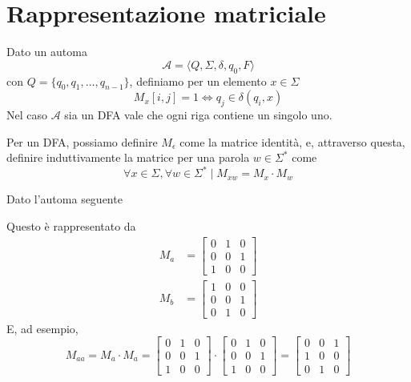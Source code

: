 \documentclass[12pt]{article}
\begin{document}
\section{Rappresentazione matriciale}
Dato un automa
$$ \mathcal{A} = \langle Q, \Sigma, \delta, q_0, F \rangle $$
con $Q = \{q_0, q_1, \dots, q_{n - 1} \}$, definiamo per un elemento $x \in \Sigma$
$$ M_x[i, j] = 1 \Leftrightarrow q_j \in \delta(q_i, x) $$
Nel caso $\mathcal{A}$ sia un DFA vale che ogni riga contiene un singolo uno.

Per un DFA, possiamo definire $ M_\epsilon$ come la matrice identità, e, attraverso questa, definire induttivamente la matrice per una parola $w \in \Sigma^*$ come
$$ \forall x \in \Sigma, \forall w \in \Sigma^* \mid M_{xw} = M_x \cdot M_w $$

\begin{tcolorbox}
	Dato l'automa seguente
	\begin{center}
	\end{center}
	Questo è rappresentato da
	\begin{align*}
		M_a &= \begin{bmatrix} 0 & 1 & 0 \\ 0 & 0 & 1 \\ 1 & 0 & 0 \end{bmatrix} \\
		M_b &= \begin{bmatrix} 1 & 0 & 0 \\ 0 & 0 & 1 \\ 0 & 1 & 0 \end{bmatrix}
	\end{align*}
	E, ad esempio,
	$$ M_{aa} = M_a \cdot M_a = \begin{bmatrix} 0 & 1 & 0 \\ 0 & 0 & 1 \\ 1 & 0 & 0 \end{bmatrix} \cdot \begin{bmatrix} 0 & 1 & 0 \\ 0 & 0 & 1 \\ 1 & 0 & 0 \end{bmatrix} = \begin{bmatrix} 0 & 0 & 1 \\ 1 & 0 & 0 \\ 0 & 1 & 0 \end{bmatrix} $$
\end{tcolorbox}
\end{document}
